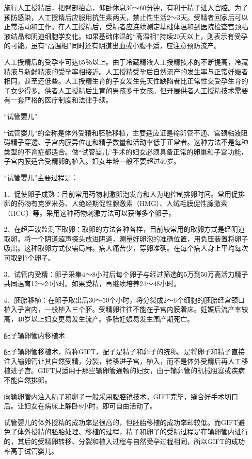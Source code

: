 \documentclass[12pt,UTF8,openany]{ctexbook}
\begin{document}
施行人工授精后，把臀部抬高，仰卧休息30～60分钟，有利于精子进入官腔。为了预防感染，人工授精后应服用抗生素两天，禁止性生活2～3天。受精者回家后可以正常活动和工作。在人工授精后，受精者应连续测定基础体温和到医院检查宫颈粘液结晶和阴道细胞学变化。如果基础体温的“高温相”持续20天以上，则表示有受孕的可能。虽有“高温相”同时还有阴道出血或小腹不适，应注意预防流产。

人工授精后的受孕率可达65％以上。由于冷藏精液人工授精技术的不断提高，冷藏精液与新鲜精液的受孕率相接近。人工授精受孕后自然流产的发生率与正常妊娠者相同，甚至还低些。人工授精生育的子女发生先天性缺陷者比正常性交受孕生育的子女少得多。供者人工授精后生育的男孩多于女孩。但开展供者人工授精技术需要有一套严格的医疗制度和法律手续。

“试管婴儿”

“试管婴儿”的全称是体外受精和胚胎移植，主要适应证是输卵管不通、宫颈粘液阻碍精子穿透、子宫内膜异位症和精子数量和活动率低于正常者。这种方法不是每种类型的不育症都适合。做“试管婴儿”手术的妇女必须具备正常的卵巢和子宫功能，子宫内膜适合受精卵的植入。妇女年龄一般不要超过40岁。

“试管婴儿”主要过程是：

1．促使卵子成熟：目前常用药物刺激卵泡发育和人为地控制排卵时间。常用促排卵的药物有克罗米芬、人绝经期促性腺激素（HMG）、人绒毛膜促性腺激素（HCG）等。采用这种药物刺激方法可以获得多个卵子。

2．在超声波监测下取卵：取卵的方法各种各样，目前较常用的取卵方式是经阴道取卵。将一个阴道超声探头放进阴道，测量好卵泡的准确位置，用负压装置将卵子吸出。这种取卵方式仅需局麻。病人痛苦少，穿卵准确。在每个病人身上平均每次可取到5个卵子。

3．试管内受精：卵子采集4～8小时后每个卵子与经过筛选的5万到50万高活力精子共同温育12～24小时。如果受精，再继续培养24～48小时。

4．胚胎移植：在卵子取出后30～50个小时，将分裂成2～6个细胞的胚胎经宫颈口植入子宫内，一般植入三个胚。受精卵往往不能在子宫内膜着床。妊娠后流产率较高，40岁以上妇女更易发生流产。多胎妊娠易发生围产期死亡。

配子输卵管内移植术

配子输卵管移植术，简称GIFT，配子是精子和卵子的统称。是将卵子和精子直接注入输卵管让其自然受精，分裂，转移进子宫，植入，而不是体外受精后再人工移植进子宫。GIFT只适用于那些输卵管通畅的妇女，由于输卵管的机械阻塞或疾病不能自然排卵。

向输卵管内注入精子和卵子一般采用腹腔镜技术。GIFT完毕，缝合好手术切口后。让妇女在病床上静卧8小时，即可自由活动了。

试管婴儿的体外授精的成功率是很高的，但胚胎移植的成功率却较低。而GIFT避免了体外授精的胚胎处理、移植的过程，精子和卵子的受精过程是在输卵管内进行的，其后的受精卵转移、分裂和植入过程与自然受孕过程相同，所以GIFT的成功率高于试管婴儿。
\end{document}
